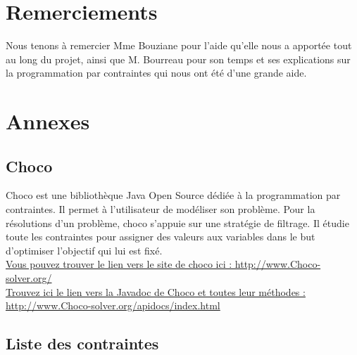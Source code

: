 \documentclass[12pt,a4paper]{article}
\begin{document}
\section{Remerciements}

Nous tenons à remercier Mme Bouziane pour l'aide qu'elle nous a apportée tout au long du projet, ainsi que M. Bourreau pour son temps et ses explications sur la programmation par contraintes qui nous ont été d'une grande aide. 

\newpage
\section{Annexes}

\subsection{Choco}
\label{Choco}
Choco est une bibliothèque Java Open Source dédiée à la programmation par contraintes.
Il permet à l'utilisateur de modéliser son problème.
Pour la résolutions d'un problème, choco s'appuie sur une stratégie de filtrage. Il étudie toute les contraintes pour assigner des valeurs aux variables dans le but d'optimiser l'objectif qui lui est fixé.
\\

 \href{http://www.Choco-solver.org/}{Vous pouvez trouver le lien vers le site de choco ici : http://www.Choco-solver.org/}
 \\
 
 \href{http://www.Choco-solver.org/apidocs/index.html}{Trouvez ici le lien vers la Javadoc de Choco et toutes leur méthodes : http://www.Choco-solver.org/apidocs/index.html}
\subsection{Liste des contraintes}
\label{listContraintes}
\end{document}
